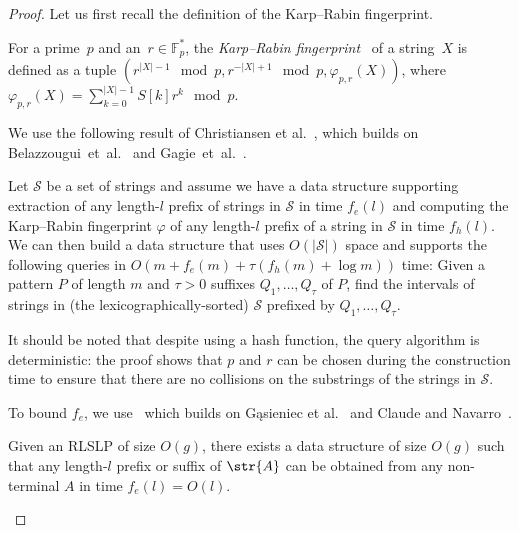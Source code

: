 \begin{proof}
    Let us first recall the definition of the Karp--Rabin fingerprint.
    
    \begin{definition}
    For a prime~$p$ and an~$r \in \mathbb{F}_p^\ast$, the \emph{Karp--Rabin fingerprint}~\cite{karp1987efficient} of a string~$X$ is defined as a tuple $(r^{|X|-1} \mod p, r^{-|X|+1} \mod p, \varphi_{p,r}(X))$, where $\varphi_{p,r}(X)=\sum_{k=0}^{|X|-1} S[k]r^k\mod p$.
    \end{definition}
    
    We use the following result of Christiansen et al.~\cite{talg/ChristiansenEKN21}, which builds on Belazzougui~et~al.~\cite{esa/BelazzouguiBPV10} and Gagie~et~al.~\cite{latin/GagieGKNP14,soda/GagieNP18}.
     
    \begin{fact}\label{fact:compact_trie}
    Let $\mathcal{S}$ be a set of strings and assume we have a data structure supporting extraction of any length-$l$ prefix of strings in $\mathcal{S}$ in
    time $f_e(l)$ and computing the Karp--Rabin fingerprint $\varphi$ of any length-$l$ prefix of a string in $\mathcal{S}$
    in time $f_h(l)$. We can then build a data structure that uses $O(|\mathcal{S}|)$ space and supports the following queries in $O(m + f_e (m) + \tau ( f_h (m) + \log m))$ time: Given a pattern $P$ of length $m$ and $\tau > 0$
    suffixes $Q_1,\dots,Q_{\tau}$ of $P$, find the intervals of strings in (the lexicographically-sorted) $\mathcal{S}$ prefixed by
    $Q_1,\dots,Q_{\tau}$.
    \end{fact}
    
    It should be noted that despite using a hash function, the query algorithm is deterministic: the proof shows that $p$ and $r$ can be chosen during the construction time to ensure that there are no collisions on the substrings of the strings in $\mathcal{S}$.  
    
    To bound $f_e$, we use~\cite[Lemma 6.6]{talg/ChristiansenEKN21} which builds on G\k{a}sieniec et al.~\cite{dcc/GasieniecKPS05} and Claude and Navarro~\cite{spire/ClaudeN12a}.
    
    \begin{fact}\label{fact:prefsuf_extraction} Given an RLSLP
    of size $O(g)$, there exists a data structure of size $O(g)$ such that any length-$l$ prefix or suffix of $\str{A}$ can be
    obtained from any non-terminal $A$ in time $f_e(l) = O(l)$.
    \end{fact}
    

\end{proof}
